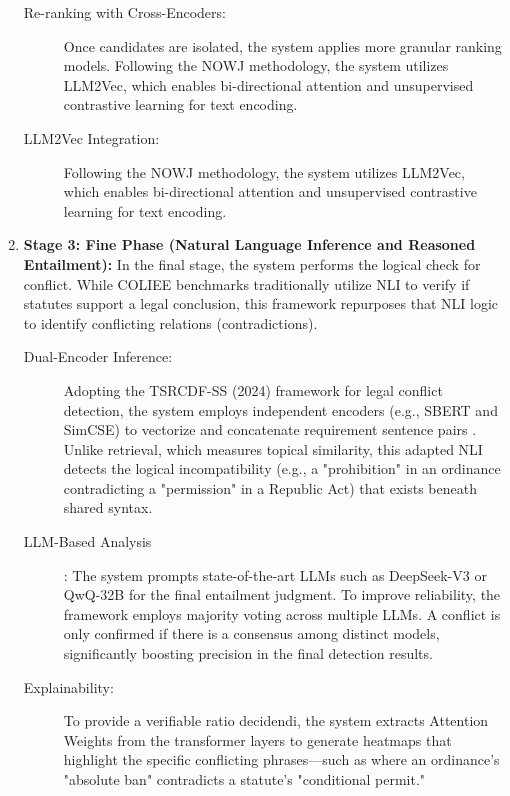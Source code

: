 \begin{enumerate}
\begin{description}
        \item[Re-ranking with Cross-Encoders:] Once candidates are isolated, the system applies more granular ranking models. Following the NOWJ methodology, the system utilizes LLM2Vec, which enables bi-directional attention and unsupervised contrastive learning for text encoding.

        \item[LLM2Vec Integration:] Following the NOWJ methodology, the system utilizes LLM2Vec, which enables bi-directional attention and unsupervised contrastive learning for text encoding. 
    \end{description}
    
    \item \textbf{Stage 3: Fine Phase (Natural Language Inference and Reasoned Entailment):} In the final stage, the system performs the logical check for conflict. While COLIEE benchmarks traditionally utilize NLI to verify if statutes support a legal conclusion, this framework repurposes that NLI logic to identify conflicting relations (contradictions).

    \begin{description}
        \item[Dual-Encoder Inference:] Adopting the TSRCDF-SS (2024) framework for legal conflict detection, the system employs independent encoders (e.g., SBERT and SimCSE) to vectorize and concatenate requirement sentence pairs \cite{wang2025transferlearningapproachautomatic}. Unlike retrieval, which measures topical similarity, this adapted NLI detects the logical incompatibility (e.g., a "prohibition" in an ordinance contradicting a "permission" in a Republic Act) that exists beneath shared syntax. \cite{kim2024legal}
        
        \item[LLM-Based Analysis]:  The system prompts state-of-the-art LLMs such as DeepSeek-V3 or QwQ-32B for the final entailment judgment.  To improve reliability, the framework employs majority voting across multiple LLMs. A conflict is only confirmed if there is a consensus among distinct models, significantly boosting precision in the final detection results. \cite{goebeletal2026coliee2025}

        \item[Explainability:] To provide a verifiable ratio decidendi, the system extracts Attention Weights from the transformer layers to generate heatmaps that highlight the specific conflicting phrases—such as where an ordinance's "absolute ban" contradicts a statute's "conditional permit."
    \end{description}
\end{enumerate}

